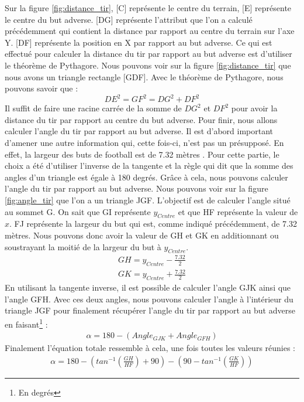 \documentclass[12pt]{article}
\begin{document}
Sur la figure \ref{fig:distance_tir}, [C] représente le centre du terrain, [E] représente le centre du but adverse.
    [DG] représente l'attribut que l'on a calculé précédemment qui contient la distance par rapport au centre du terrain sur l'axe Y.
    [DF] représente la position en X par rapport au but adverse.
Ce qui est effectué pour calculer la distance du tir par rapport au but adverse est d'utiliser le théorème de Pythagore.
Nous pouvons voir sur la figure \ref{fig:distance_tir} que nous avons un triangle rectangle [GDF].
Avec le théorème de Pythagore, nous pouvons savoir que :
\begin{equation}
    DE^2 = GF^2 = DG^2 + DF^2
\end{equation}
Il suffit de faire une racine carrée de la somme de $DG^2$ et $DF^2$ pour avoir la distance du tir par rapport au centre du but adverse.
\newline\newline
Pour finir, nous allons calculer l'angle du tir par rapport au but adverse.
Il est d'abord important d'amener une autre information qui, cette fois-ci, n'est pas un présupposé.
En effet, la largeur des buts de football est de 7.32 mètres \cite{TerrainIFAB}.
Pour cette partie, le choix a été d'utiliser l'inverse de la tangente et la règle qui dit que la somme des angles d'un triangle est égale à 180 degrés.
Grâce à cela, nous pouvons calculer l'angle du tir par rapport au but adverse.
Nous pouvons voir sur la figure \ref{fig:angle_tir} que l'on a un triangle JGF.
L'objectif est de calculer l'angle situé au sommet G.
On sait que GI représente $y_{Centre}$ et que HF représente la valeur de $x$.
FJ représente la largeur du but qui est, comme indiqué précédemment, de 7.32 mètres.
Nous pouvons donc avoir la valeur de GH et GK en additionnant ou soustrayant la moitié de la largeur du but à $y_{Centre}$.
\begin{equation}
    \begin{split}
        GH = y_{Centre} - \frac{7.32}{2} \\
        GK = y_{Centre} + \frac{7.32}{2}
    \end{split}
\end{equation}
En utilisant la tangente inverse, il est possible de calculer l'angle GJK ainsi que l'angle GFH.
Avec ces deux angles, nous pouvons calculer l'angle à l'intérieur du triangle JGF pour finalement récupérer l'angle du tir par rapport au but adverse en faisant\footnote{En degrés} :
\begin{equation}
    \begin{split}
        \alpha = 180 - (Angle_{GJK} + Angle_{GFH})
    \end{split}
\end{equation}
Finalement l'équation totale ressemble à cela, une fois toutes les valeurs réunies :
\begin{equation}
    \begin{split}
        \alpha = 180 - (tan^{-1}(\frac{GH}{HF}) + 90) - (90 -tan^{-1}(\frac{GK}{HF}))
    \end{split}
\end{equation}
\end{document}
